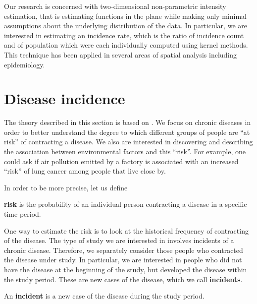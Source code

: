 

Our research is concerned with two-dimensional non-parametric intensity estimation,
that is estimating functions in the plane while making only minimal assumptions about the underlying distribution of the data. 
In particular, we are interested in estimating an incidence rate,
which is the ratio of incidence count and of population which were each individually computed using kernel methods.
This technique has been applied in several areas of spatial analysis including epidemiology.

\section{Disease incidence}
\label{sec:theory:incidence}

The theory described in this section is based on \citet{rothman2008modern}.
We focus on chronic diseases in order to better understand the degree to which different groups of people are ``at risk'' of contracting a disease.
We also are interested in discovering and describing the association between environmental factors and this ``risk''.
For example, one could ask if air pollution emitted by a factory is associated with an increased ``risk'' of lung cancer among people that live close by.

In order to be more precise, let us define

\begin{defn}
    \textbf{\Gls{risk}} is the probability of an individual person contracting a disease in a specific time period.
\end{defn}

One way to estimate the \gls{risk} is to look at the historical frequency of contracting of the disease.
The type of study we are interested in involves incidents of a chronic disease.
Therefore, we separately consider those people who contracted the disease under study.
In particular, we are interested in people who did not have the disease at the beginning of the study,
but developed the disease within the study period.
These are new cases of the disease, which we call \textbf{\glspl{incident}}.

\begin{defn}
    An \textbf{\gls{incident}} is a new case of the disease during the study period.
\end{defn}

